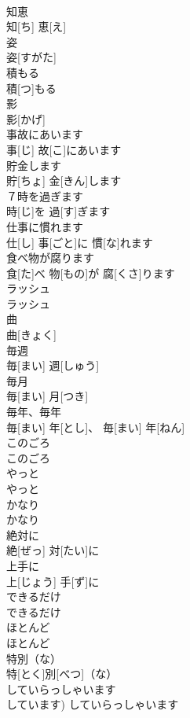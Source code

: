 \documentclass[8pt]{extreport}
\begin{document}
\begin{CJK}{UTF8}{min}
\\	知恵	
\\	知[ち] 恵[え]		
\\	姿	
\\	姿[すがた]		
\\	積もる	
\\	積[つ]もる		
\\	影	
\\	影[かげ]		
\\	事故にあいます	
\\	事[じ] 故[こ]にあいます		
\\	貯金します	
\\	貯[ちょ] 金[きん]します		
\\	７時を過ぎます	
\\	時[じ]を 過[す]ぎます		
\\	仕事に慣れます	
\\	仕[し] 事[ごと]に 慣[な]れます		
\\	食べ物が腐ります	
\\	食[た]べ 物[もの]が 腐[くさ]ります		
\\	ラッシュ	
\\	ラッシュ		
\\	曲	
\\	曲[きょく]		
\\	毎週	
\\	毎[まい] 週[しゅう]		
\\	毎月	
\\	毎[まい] 月[つき]		
\\	毎年、毎年	
\\	毎[まい] 年[とし]、 毎[まい] 年[ねん]		
\\	このごろ	
\\	このごろ		
\\	やっと	
\\	やっと		
\\	かなり	
\\	かなり		
\\	絶対に	
\\	絶[ぜっ] 対[たい]に		
\\	上手に	
\\	上[じょう] 手[ず]に		
\\	できるだけ	
\\	できるだけ		
\\	ほとんど	
\\	ほとんど		
\\	特別（な）	
\\	特[とく]別[べつ]（な）		
\\	していらっしゃいます	
\\	しています)	していらっしゃいます		

\end{CJK}
\end{document}
